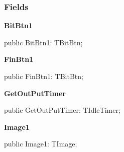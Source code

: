 \documentclass{report}
\newif\ifpdf
\begin{document}
\subsubsection*{\large{\textbf{Fields}}\normalsize\hspace{1ex}\hfill}
\begin{list}{}{
\setlength{\itemindent}{0cm}
\setlength{\listparindent}{0cm}
\setlength{\leftmargin}{\evensidemargin}
\addtolength{\leftmargin}{\tmplength}
\settowidth{\labelsep}{X}
\addtolength{\leftmargin}{\labelsep}
\setlength{\labelwidth}{\tmplength}
}
\label{dgunit.TDGForm-BitBtn1}
\item[\textbf{BitBtn1}\hfill]
\ifpdf
\begin{flushleft}
\fi
\begin{ttfamily}
public BitBtn1: TBitBtn;\end{ttfamily}

\ifpdf
\end{flushleft}
\fi


\par  \label{dgunit.TDGForm-FinBtn1}
\item[\textbf{FinBtn1}\hfill]
\ifpdf
\begin{flushleft}
\fi
\begin{ttfamily}
public FinBtn1: TBitBtn;\end{ttfamily}

\ifpdf
\end{flushleft}
\fi


\par  \label{dgunit.TDGForm-GetOutPutTimer}
\item[\textbf{GetOutPutTimer}\hfill]
\ifpdf
\begin{flushleft}
\fi
\begin{ttfamily}
public GetOutPutTimer: TIdleTimer;\end{ttfamily}

\ifpdf
\end{flushleft}
\fi


\par  \label{dgunit.TDGForm-Image1}
\item[\textbf{Image1}\hfill]
\ifpdf
\begin{flushleft}
\fi
\begin{ttfamily}
public Image1: TImage;\end{ttfamily}

\ifpdf
\end{flushleft}
\fi



\end{list}
\end{document}
